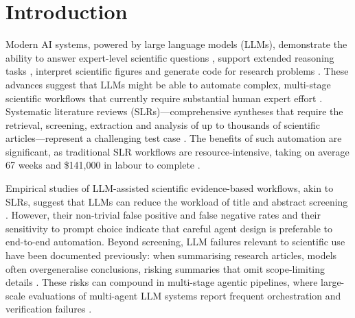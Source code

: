 \section{Introduction}


Modern AI systems, powered by large language models (LLMs), demonstrate the ability to answer expert-level scientific questions \cite{reinGPQAGraduatelevelGoogleproof2024}, support extended reasoning tasks \cite{kwaMeasuringAIAbility2025}, interpret scientific figures \cite{robertsSciFIBenchBenchmarkingLarge2024} and generate code for research problems \cite{tianSciCodeResearchCoding2024a}. These advances suggest that LLMs might be able to automate complex, multi-stage scientific workflows that currently require substantial human expert effort \cite{wangScientificDiscoveryAge2023, zhang2025exploring, lu2024aiscientist}. Systematic literature reviews (SLRs)---comprehensive syntheses that require the retrieval, screening, extraction and analysis of up to thousands of scientific articles---represent a challenging test case \cite{zahaviHowLargeLanguage2025}. The benefits of such automation are significant, as traditional SLR workflows are resource‑intensive, taking on average 67 weeks \citep{borah2017analysis, michelson2019significant} and \$141,000 in labour to complete \citep{michelson2019significant}.

Empirical studies of LLM-assisted scientific evidence-based workflows, akin to SLRs, suggest that LLMs can reduce the workload of title and abstract screening \citep{oami2024performance}. However, their non-trivial false positive and false negative rates and their sensitivity to prompt choice indicate that careful agent design is preferable to end-to-end automation. Beyond screening, LLM failures relevant to scientific use have been documented previously: when summarising research articles, models often overgeneralise conclusions, risking summaries that omit scope-limiting details \citep{peters2025generalization}. These risks can compound in multi-stage agentic pipelines, where large-scale evaluations of multi-agent LLM systems report frequent orchestration and verification failures \citep{pan2025multiagent}.

